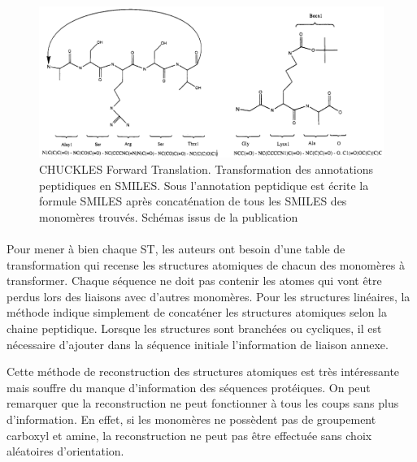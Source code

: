 \documentclass[12pt,french,twoside]{report}
\begin{document}
\begin{figure}[!h]
  \begin{center}
    \includegraphics[width=450px]{Figures/s2m/formalisation/CHUCK_FT.png}
    \caption{\label{chuck_ft}CHUCKLES Forward Translation.
    Transformation des annotations peptidiques en SMILES.
    Sous l'annotation peptidique est écrite la formule SMILES après concaténation de tous les SMILES des monomères trouvés.
    Schémas issus de la publication}
  \end{center}
\end{figure}

\paragraph{}Pour mener à bien chaque ST, les auteurs ont besoin d'une table de transformation qui recense les structures atomiques de chacun des monomères à transformer.
Chaque séquence ne doit pas contenir les atomes qui vont être perdus lors des liaisons avec d'autres monomères.
Pour les structures linéaires, la méthode indique simplement de concaténer les structures atomiques selon la chaine peptidique.
Lorsque les structures sont branchées ou cycliques, il est nécessaire d'ajouter dans la séquence initiale l'information de liaison annexe.

Cette méthode de reconstruction des structures atomiques est très intéressante mais souffre du manque d'information des séquences protéiques.
On peut remarquer que la reconstruction ne peut fonctionner à tous les coups sans plus d'information.
En effet, si les monomères ne possèdent pas de groupement carboxyl et amine, la reconstruction ne peut pas être effectuée sans choix aléatoires d'orientation.
\end{document}

